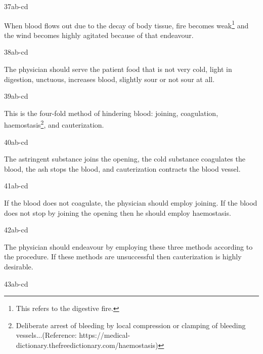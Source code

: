 \begin{translation}
\item[37ab-cd]

\begin{sloka}
When blood flows out due to the decay of body tissue, fire becomes weak\footnote{This refers to the digestive fire.} and the wind becomes highly agitated because of that endeavour.
\end{sloka}

\item[38ab-cd]

\begin{sloka}
The physician should serve the patient food that is not very cold, light in digestion, unctuous, increases blood, slightly sour or not sour at all. 
\end{sloka}

\item[39ab-cd]

\begin{sloka}
This is the four-fold method of hindering blood: joining, coagulation, 
haemostasis\footnote{Deliberate arrest of bleeding by local compression or 
clamping of bleeding vessels...(Reference: 
https://medical-dictionary.thefreedictionary.com/haemostasis)}, and cauterization.  
\end{sloka}

\item[40ab-cd]

\begin{sloka}
The astringent substance joins the opening, the cold substance coagulates the blood, the ash stops the blood, and cauterization contracts the blood vessel.
\end{sloka}

\item[41ab-cd]

\begin{sloka}
If the blood does not coagulate, the physician should employ joining. If the blood does not stop by joining the opening then he should employ haemostasis.
\end{sloka}

\item[42ab-cd]

\begin{sloka}
The physician should endeavour by employing these three methods according to the procedure. If these methods are unsuccessful then cauterization is highly desirable.
\end{sloka}

\item[43ab-cd]


\end{translation}
